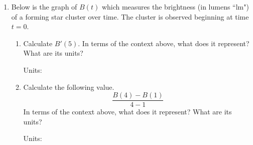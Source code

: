 \documentclass[11pt]{article}
\begin{document}
\begin{enumerate}

\item Below is the graph of $B(t)$ which measures the brightness (in lumens ``lm") of a forming star cluster over time. The cluster is observed beginning at time $t=0$.

\begin{center}
\end{center}

\begin{enumerate}

\item Calculate $B'(5)$. In terms of the context above, what does it represent? What are its units?

\vspace{1.5cm}

\noindent  \hfill Units:  \underline{\hspace{2.5in}}

\vspace{4cm}

\item Calculate the following value. 
\[
\frac{B(4)-B(1)}{4-1}
\]
In terms of the context above, what does it
represent? What are its units?

\vspace{1.5cm}

\noindent \hfill Units: \underline{\hspace{2.5in}}

\vspace{4cm}



\end{enumerate}
\end{enumerate}
\end{document}
